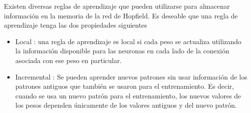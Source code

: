 Existen diversas reglas de aprendizaje que pueden utilizarse para almacenar información en la memoria de la red de Hopfield. Es deseable que una regla de aprendizaje tenga las dos propiedades siguientes
\begin{itemize}
    \item Local : una regla de aprendizaje es local si cada peso se actualiza utilizando la información disponible para las neuronas en cada lado de la conexión asociada con ese peso en particular.

    \item Incremental : Se pueden aprender nuevos patrones sin usar información de los patrones antiguos que también se usaron para el entrenamiento. Es decir, cuando se usa un nuevo patrón para el entrenamiento, los nuevos valores de los pesos dependen únicamente de los valores antiguos y del nuevo patrón. 

\end{itemize}
